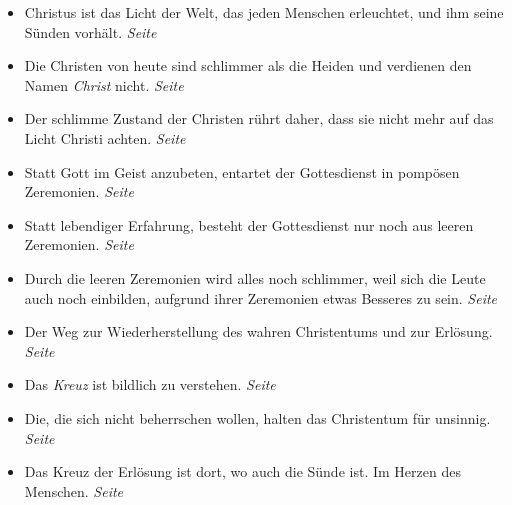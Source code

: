 \begin{itemize}
 \item Christus ist das Licht der Welt, das jeden Menschen erleuchtet, und ihm
seine Sünden vorhält.
 \dotfill \textit{Seite~\pageref{ref:02_03_gott_in_jedem}}\\

 \item Die Christen von heute sind schlimmer als die Heiden und verdienen den
Namen \textit{Christ} nicht.
 \dotfill \textit{Seite~\pageref{ref:02_08_schlimmer_als_heiden}}\\

 \item Der schlimme Zustand der Christen rührt daher, dass sie nicht mehr auf das
Licht Christi achten.
 \dotfill \textit{Seite~\pageref{ref:02_08_ursache_des_abfalls}}\\
 \item Statt Gott im Geist anzubeten, entartet der Gottesdienst in pompösen
Zeremonien.
 \dotfill \textit{Seite~\pageref{ref:02_08_falscher_gottesdienst}}\\

 \item Statt lebendiger Erfahrung, besteht der Gottesdienst nur noch aus leeren
Zeremonien. \dotfill \textit{Seite~\pageref{ref:02_09_lebendige_erfahrung}}\\

 \item Durch die leeren Zeremonien wird alles noch schlimmer, weil sich die
Leute auch noch einbilden, aufgrund ihrer Zeremonien etwas Besseres zu sein.
 \dotfill \textit{Seite~\pageref{ref:02_09_selbstueberschaetzung}}\\

 \item Der Weg zur Wiederherstellung des wahren Christentums und zur Erlösung.
 \dotfill \textit{Seite~\pageref{ref:02_10_abhilfe}}\\

 \item Das \textit{Kreuz} ist bildlich zu verstehen.
 \dotfill \textit{Seite~\pageref{ref:03_01_das_kreuz}}\\

 \item Die, die sich nicht beherrschen wollen, halten das Christentum für
unsinnig.
 \dotfill \textit{Seite~\pageref{ref:03_02_leidenschaft}}\\

 \item Das Kreuz der Erlösung ist dort, wo auch die Sünde ist. Im Herzen des Menschen.
 \dotfill \textit{Seite~\pageref{ref:03_03_ort_des_kreuzes}}\\


\end{itemize}
